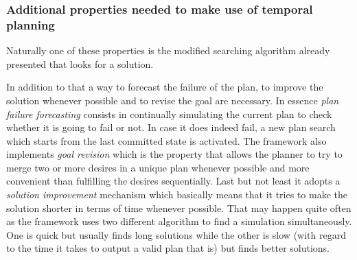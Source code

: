 \subsubsection{Additional properties needed to make use of temporal planning} Naturally one of these properties is the modified searching algorithm already presented that looks for a solution.
\par
In addition to that a way to forecast the failure of the plan, to improve the solution whenever possible and to revise the goal are necessary. In essence \emph{plan failure forecasting} consists in continually simulating the current plan to check whether it is going to fail or not. In case it does indeed fail, a new plan search which starts from the last committed state is activated. The framework also implements \emph{goal revision} which is the property that allows the planner to try to merge two or more desires in a unique plan whenever possible and more convenient than fulfilling the desires sequentially. Last but not least it adopts a \emph{solution improvement} mechanism which basically means that it tries to make the solution shorter in terms of time whenever possible. That may happen quite often as the framework uses two different algorithm to find a simulation simultaneously. One is quick but usually finds long solutions while the other is slow (with regard to the time it takes to output a valid plan that is) but finds better solutions.
\cite{alex_thesis}
\cite{javaff_repo}
\cite{ojff_repo}
\newpage
